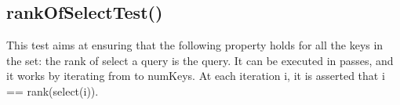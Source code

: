 \subsection{{\ttfamily rankOfSelectTest()}}

This test aims at ensuring that the following property holds for all the keys in the set: the rank of select a query is the query. It can be executed in passes, and it works by iterating from {} to {\ttfamily numKeys}. At each iteration {\ttfamily i}, it is asserted that {\ttfamily i == rank(select(i))}.